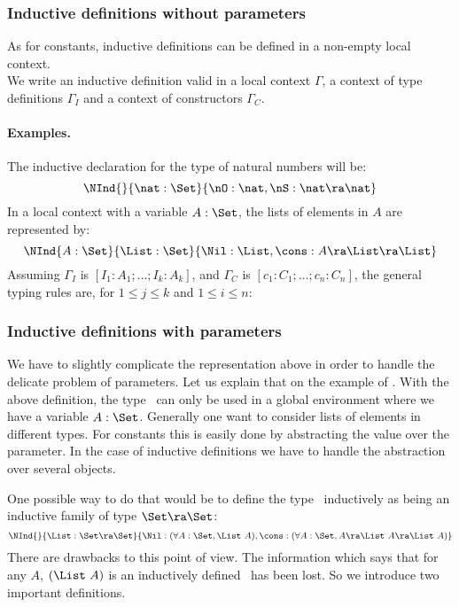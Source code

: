 \subsubsection{Inductive definitions without parameters}
As for constants, inductive definitions can be defined in a non-empty
local context. \\
We write  an inductive
definition valid in a local context $\Gamma$, a
context of type definitions $\Gamma_I$ and a context of constructors
$\Gamma_C$.
\paragraph{Examples.}
The inductive declaration for the type of natural numbers will be:
\[\NInd{}{\nat:\Set}{\nO:\nat,\nS:\nat\ra\nat}\]
In a local context with a variable $A:\Set$, the lists of elements in $A$ are
represented by:
\[\NInd{A:\Set}{\List:\Set}{\Nil:\List,\cons : A \ra \List \ra
  \List}\]
 Assuming 
  $\Gamma_I$ is $[I_1:A_1;\ldots;I_k:A_k]$, and $\Gamma_C$ is
  $[c_1:C_1;\ldots;c_n:C_n]$, the general typing rules are, 
  for $1\leq j\leq k$ and $1\leq i\leq n$:

\bigskip
{}


\subsubsection{Inductive definitions with parameters}

We have to slightly complicate the representation above in order to handle
the delicate problem of parameters. 
Let us explain that on the example of \List. With the above definition,
the type \List\ can only be used in a global environment where we
have a variable $A:\Set$. Generally one want to consider lists of
elements in different types. For constants this is easily done by abstracting
the value over the parameter. In the case of inductive definitions we
have to handle the abstraction over several objects.

One possible way to do that would be to define the type \List\
inductively as being an inductive family of type $\Set\ra\Set$:
\[\NInd{}{\List:\Set\ra\Set}{\Nil:(\forall A:\Set,\List~A),
  \cons : (\forall A:\Set, A \ra \List~A \ra \List~A)}\]
There are drawbacks to this point of view. The
information which says that for any $A$, $(\List~A)$ is an inductively defined
\Set\ has been lost.
So we introduce two important definitions.

